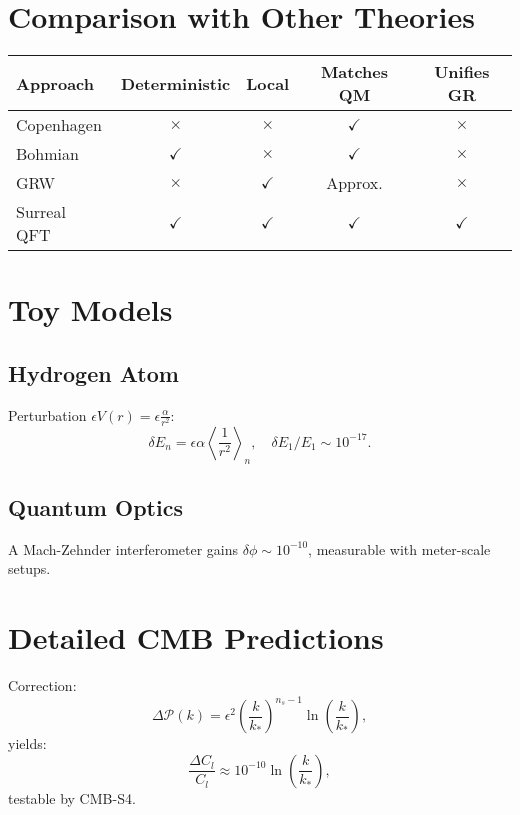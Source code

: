 \documentclass{article}
\begin{document}
\section{Comparison with Other Theories}
\begin{center}
\begin{tabular}{lcccc}
\hline
\textbf{Approach} & \textbf{Deterministic} & \textbf{Local} & \textbf{Matches QM} & \textbf{Unifies GR} \\
\hline
Copenhagen & $\times$ & $\times$ & $\checkmark$ & $\times$ \\
Bohmian & $\checkmark$ & $\times$ & $\checkmark$ & $\times$ \\
GRW & $\times$ & $\checkmark$ & Approx. & $\times$ \\
Surreal QFT & $\checkmark$ & $\checkmark$ & $\checkmark$ & $\checkmark$ \\
\hline
\end{tabular}
\end{center}

\section{Toy Models}
\subsection{Hydrogen Atom}
Perturbation \(\epsilon V(r) = \epsilon \frac{\alpha}{r^2}\):
\begin{equation}
\delta E_n = \epsilon \alpha \left\langle \frac{1}{r^2} \right\rangle_n, \quad \delta E_1 / E_1 \sim 10^{-17}.
\end{equation}

\subsection{Quantum Optics}
A Mach-Zehnder interferometer gains \(\delta \phi \sim 10^{-10}\), measurable with meter-scale setups.

\section{Detailed CMB Predictions}
Correction:
\begin{equation}
\Delta \mathcal{P}(k) = \epsilon^2 \left( \frac{k}{k_*} \right)^{n_s-1} \ln \left( \frac{k}{k_*} \right),
\end{equation}
yields:
\begin{equation}
\frac{\Delta C_l}{C_l} \approx 10^{-10} \ln \left( \frac{k}{k_*} \right),
\end{equation}
testable by CMB-S4.
\end{document}

